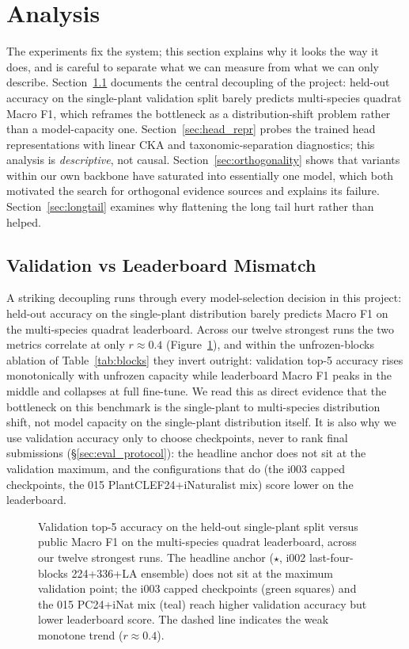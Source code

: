 \section{Analysis}
\label{sec:analysis}

The experiments fix the system; this section explains why it looks the way it does, and is
careful to separate what we can measure from what we can only describe.
Section~\ref{sec:val_lb} documents the central decoupling of the project: held-out accuracy on
the single-plant validation split barely predicts multi-species quadrat Macro F1, which reframes
the bottleneck as a distribution-shift problem rather than a model-capacity one.
Section~\ref{sec:head_repr} probes the trained head representations with linear CKA and
taxonomic-separation diagnostics; this analysis is \emph{descriptive}, not causal.
Section~\ref{sec:orthogonality} shows that variants within our own backbone have saturated into
essentially one model, which both motivated the search for orthogonal evidence sources and
explains its failure. Section~\ref{sec:longtail} examines why flattening the long tail hurt rather
than helped.

\subsection{Validation vs Leaderboard Mismatch}
\label{sec:val_lb}

A striking decoupling runs through every model-selection decision in this project: held-out
accuracy on the single-plant distribution barely predicts Macro F1 on the multi-species quadrat
leaderboard. Across our twelve strongest runs the two metrics correlate at only $r \approx 0.4$
(Figure~\ref{fig:val_vs_kaggle}), and within the unfrozen-blocks ablation of
Table~\ref{tab:blocks} they invert outright: validation top-5 accuracy rises monotonically with
unfrozen capacity while leaderboard Macro F1 peaks in the middle and collapses at full
fine-tune. We read this as direct evidence that the bottleneck on this benchmark is the
single-plant to multi-species distribution shift, not model capacity on the single-plant
distribution itself. It is also why we use validation accuracy only to choose checkpoints, never
to rank final submissions (\S\ref{sec:eval_protocol}): the headline anchor does not sit at the
validation maximum, and the configurations that do (the i003 capped checkpoints, the 015
PlantCLEF24+iNaturalist mix) score lower on the leaderboard.

\begin{figure}[!htbp]
  \centering
  
  \caption{Validation top-5 accuracy on the held-out single-plant split versus public Macro F1 on the multi-species quadrat leaderboard, across our twelve strongest runs. The headline anchor ($\star$, i002 last-four-blocks 224+336+LA ensemble) does not sit at the maximum validation point; the i003 capped checkpoints (green squares) and the 015 PC24+iNat mix (teal) reach higher validation accuracy but lower leaderboard score. The dashed line indicates the weak monotone trend ($r \approx 0.4$).}
  \label{fig:val_vs_kaggle}
\end{figure}

